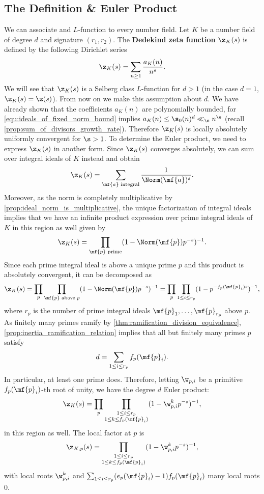     \subsection*{The Definition \& Euler Product}
      We can associate and $L$-function to every number field. Let $K$ be a number field of degree $d$ and signature $(r_{1},r_{2})$. The \textbf{Dedekind zeta function} $\z_{K}(s)$ is defined by the following Dirichlet series
      \[
        \z_{K}(s) = \sum_{n \ge 1}\frac{a_{K}(n)}{n^{s}}.
      \]
      We will see that $\z_{K}(s)$ is a Selberg class $L$-function for $d > 1$ (in the case $d = 1$, $\z_{K}(s) = \z(s)$). From now on we make this assumption about $d$. We have already shown that the coefficients $a_{K}(n)$ are polynomially bounded, for \cref{equ:ideals_of_fixed_norm_bound} implies $a_{K}(n) \le \s_{0}(n)^{d} \ll_{\e} n^{\e}$ (recall \cref{prop:sum_of_divisors_growth_rate}). Therefore $\z_{K}(s)$ is locally absolutely uniformly convergent for $\s > 1$. To determine the Euler product, we need to express $\z_{K}(s)$ in another form. Since $\z_{K}(s)$ converges absolutely, we can sum over integral ideals of $K$ instead and obtain
      \[
        \z_{K}(s) = \sum_{\text{$\mf{a}$ integral}}\frac{1}{\Norm(\mf{a})^{s}}.
      \]
      Moreover, as the norm is completely multiplicative by \cref{prop:ideal_norm_is_multiplicative}, the unique factorization of integral ideals implies that we have an infinite product expression over prime integral ideals of $K$ in this region as well given by 
      \[
        \z_{K}(s) = \prod_{\text{$\mf{p}$ prime}}(1-\Norm(\mf{p})p^{-s})^{-1}.
      \]
      Since each prime integral ideal is above a unique prime $p$ and this product is absolutely convergent, it can be decomposed as
      \[
        \z_{K}(s) = \prod_{p}\prod_{\text{$\mf{p}$ above $p$}}(1-\Norm(\mf{p})p^{-s})^{-1} = \prod_{p}\prod_{1 \le i \le r_{p}}(1-p^{-f_{p}(\mf{p}_{i})s})^{-1},
      \]
      where $r_{p}$ is the number of prime integral ideals $\mf{p}_{1},\ldots,\mf{p}_{r_{p}}$ above $p$. As finitely many primes ramify by \cref{thm:ramification_division_equivalence}, \cref{prop:inertia_ramification_relation} implies that all but finitely many primes $p$ satisfy
      \[
        d = \sum_{1 \le i \le r_{p}}f_{p}(\mf{p}_{i}).
      \]
      In particular, at least one prime does. Therefore, letting $\w_{p,i}$ be a primitive $f_{p}(\mf{p}_{i})$-th root of unity, we have the degree $d$ Euler product:
      \[
        \z_{K}(s) = \prod_{p}\prod_{\substack{1 \le i \le r_{p} \\ 1 \le k \le f_{p}(\mf{p}_{i})}}(1-\w_{p,i}^{k}p^{-s})^{-1},
      \]
      in this region as well. The local factor at $p$ is
      \[
        \z_{K,p}(s) = \prod_{\substack{1 \le i \le r_{p} \\ 1 \le k \le f_{p}(\mf{p}_{i})}}(1-\w_{p,i}^{k}p^{-s})^{-1},
      \]
      with local roots $\w_{p,i}^{k}$ and $\sum_{1 \le i \le r_{p}}(e_{p}(\mf{p}_{i})-1)f_{p}(\mf{p}_{i})$ many local roots $0$.
